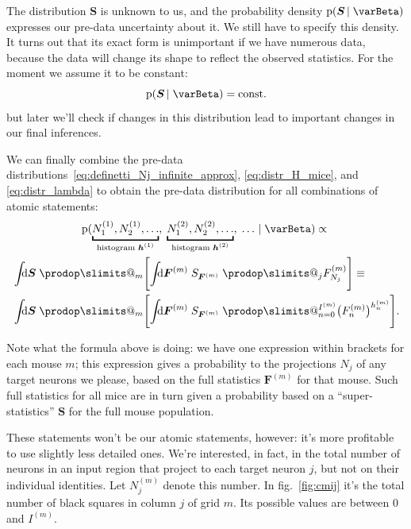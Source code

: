\documentclass[\ifafour a4paper,12pt,\else a5paper,10pt,\fi%
onecolumn,oneside,article,%
british%
]{memoir}
\makeatletter
\theoremstyle{remark}
\theoremstyle{innote}
\def\prod{\DOTSI\prodop\slimits@}
\newcommand*{\di}{\mathrm{d}}%
\newcommand*{\pf}{\mathrm{p}}%
\renewcommand*{\|}[1][]{\nonscript\,#1\vert\nonscript\;\mathopen{}}
\newcommand*{\fig}{fig.}%
\newcommand*{\yI}{\varBeta}
\newcommand*{\yF}{\bm{F}}
\newcommand*{\yFm}[1][m]{\yF^{(#1)}}
\newcommand*{\yFFm}[1][m]{F^{(#1)}}
\newcommand*{\yh}{\bm{h}}
\newcommand*{\yhm}[1][m]{\yh^{(#1)}}
\newcommand*{\yIm}[1][m]{I^{(#1)}}
\newcommand*{\yNm}[1][m]{N^{(#1)}}
\newcommand*{\ySS}{S}
\newcommand*{\yS}{\bm{\ySS}}
\makeatother
\begin{document}
The distribution $\yS$ is unknown to us, and the probability density
$\pf(\yS \| \yI)$ expresses our pre-data uncertainty about it. We still
have to specify this density. It turns out that its exact form is
unimportant if we have numerous data, because the data will change its
shape to reflect the observed statistics.
For the moment we assume it to be constant:
\begin{equation}
  \label{eq:distr_lambda}
  \pf(\yS \| \yI) = \text{const.}
\end{equation}
but later we'll check if changes in this distribution lead to important
changes in our final inferences.



We can finally combine the pre-data
distributions~\eqref{eq:definetti_Nj_infinite_approx},
\eqref{eq:distr_H_mice}, and \eqref{eq:distr_lambda} to obtain the pre-data
distribution for all combinations of  atomic statements:
\begin{multline}
  \label{eq:pre-data_final}
  \pf(\underbracket{\yNm[1]_{1},\yNm[1]_{2},\dotsc}_{\text{histogram $\yhm[1]$}},\;
  \underbracket{\yNm[2]_{1},\yNm[2]_{2},\dotsc}_{\text{histogram $\yhm[2]$}},\;
  \dotsc   \| \yI)
  \propto{}\\
  \begin{aligned}
  &\int\!\!\!\di\yS\;\prod_{m}\Biggl[\int\!\!\!\di\yFm\;
  \ySS_{\yFm} \;
  \prod_{j} \yFFm_{N_{j}}
  \Biggr]
\equiv{}\\
  &\int\!\!\!\di\yS\;\prod_{m}\Biggl[\int\!\!\!\di\yFm\;
  \ySS_{\yFm} \;
  \prod_{n=0}^{\yIm} \bigl(\yFFm_{n}\bigr)^{h^{(m)}_{n}}
  \Biggr].
  \end{aligned}
\end{multline}

Note what the formula above is doing: we have one expression within
brackets for each mouse $m$; this expression gives a probability to the
projections $N_{j}$ of any target neurons we please, based on the full
statistics $\yFm$ for that mouse. Such full statistics for all mice are in
turn given a probability based on a \enquote{super-statistics} $\yS$ for
the full mouse population.







These statements won't be our atomic statements, however: it's more
profitable to use slightly less detailed ones. We're interested, in fact,
in the total number of neurons in an input region that project to each
target neuron $j$, but not on their individual identities. Let $\yNm_{j}$
denote this number. In \fig~\ref{fig:cmij} it's the total number of black
squares in column $j$ of grid $m$. Its possible values are between $0$ and
$\yIm$.
\end{document}

